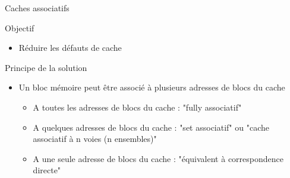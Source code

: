 %
\begin{Frame}{Caches associatifs}


      \begin{block}{Objectif}
       \begin{center}
 	\begin{itemize}
         \item Réduire les défauts de cache
        \end{itemize}
       \end{center}
      \end{block}   

  


  

  \begin{block}{Principe de la solution}
    \begin{center}
 	\begin{itemize}
        \item Un bloc mémoire peut être associé à plusieurs adresses de blocs du cache
		\begin{itemize}
		  \item A toutes les adresses de blocs du cache : "fully associatif"
		  \item A quelques adresses de blocs du cache : "set associatif" ou "cache associatif à n voies (n ensembles)"
		  \item A une seule adresse de blocs du cache : "équivalent à correspondence directe"
		\end{itemize}
        \end{itemize}
    \end{center}
  \end{block}   

 

\end{Frame}


